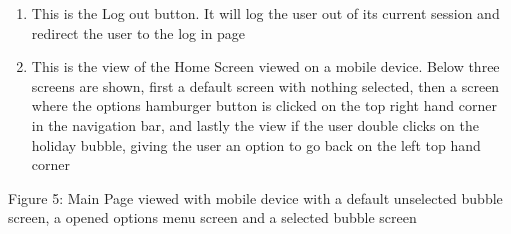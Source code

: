 \documentclass[hidelinks,english]{article}
\begin{document}
\begin{enumerate}
        \item This is the Log out button. It will log the user out of its current session and redirect the user to the log in page
        \item This is the view of the Home Screen viewed on a mobile device. Below three screens are shown, first a default screen with nothing selected, then a screen where the options hamburger button is clicked on the top right hand corner in the navigation bar, and lastly the view if the user double clicks on the holiday bubble, giving the user an option to go back on  the left top hand corner
    \end{enumerate}
    \begin{center}
	  \caption{Figure 5: Main Page viewed with mobile device with a default unselected bubble screen, a opened options menu screen and a selected bubble screen}
	  \label{mobile page}
	\end{center}
\end{document}
